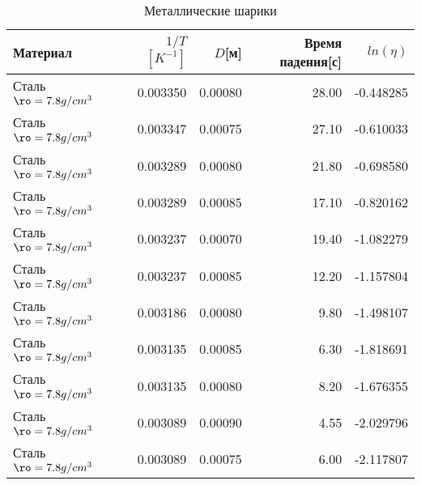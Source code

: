 \begin{table}
\centering
\caption{Металлические шарики}
\begin{tabular}{lrrrr}
\toprule
                Материал &  $1/T$ $[K^{-1}]$ &  $D$[м] &  Время падения[с] &  $ln(\eta)$ \\
\midrule
Сталь $\ro = 7.8 g/cm^3$ &          0.003350 & 0.00080 &             28.00 &   -0.448285 \\
Сталь $\ro = 7.8 g/cm^3$ &          0.003347 & 0.00075 &             27.10 &   -0.610033 \\
Сталь $\ro = 7.8 g/cm^3$ &          0.003289 & 0.00080 &             21.80 &   -0.698580 \\
Сталь $\ro = 7.8 g/cm^3$ &          0.003289 & 0.00085 &             17.10 &   -0.820162 \\
Сталь $\ro = 7.8 g/cm^3$ &          0.003237 & 0.00070 &             19.40 &   -1.082279 \\
Сталь $\ro = 7.8 g/cm^3$ &          0.003237 & 0.00085 &             12.20 &   -1.157804 \\
Сталь $\ro = 7.8 g/cm^3$ &          0.003186 & 0.00080 &              9.80 &   -1.498107 \\
Сталь $\ro = 7.8 g/cm^3$ &          0.003135 & 0.00085 &              6.30 &   -1.818691 \\
Сталь $\ro = 7.8 g/cm^3$ &          0.003135 & 0.00080 &              8.20 &   -1.676355 \\
Сталь $\ro = 7.8 g/cm^3$ &          0.003089 & 0.00090 &              4.55 &   -2.029796 \\
Сталь $\ro = 7.8 g/cm^3$ &          0.003089 & 0.00075 &              6.00 &   -2.117807 \\
\bottomrule
\end{tabular}
\end{table}
